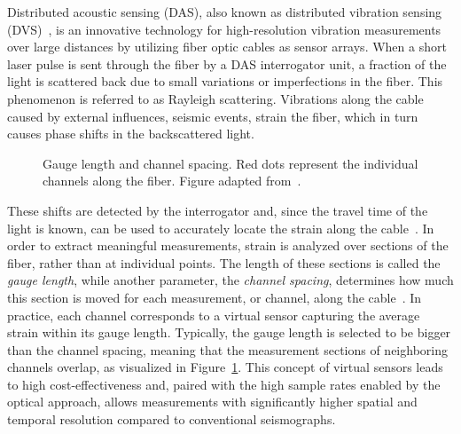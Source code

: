Distributed acoustic sensing (DAS), also known as distributed vibration sensing (DVS)~\cite{DAS}, is an innovative 
technology for high-resolution vibration measurements over large distances by utilizing fiber optic cables as sensor
arrays.
When a short laser pulse is sent through the fiber by a DAS interrogator unit, a fraction of the light is scattered back
due to small variations or imperfections in the fiber.
This phenomenon is referred to as Rayleigh scattering.
Vibrations along the cable caused by external influences, \eg seismic events, strain the fiber, which in turn causes
phase shifts in the backscattered light.
\begin{figure}
    \centering

    \caption{
        Gauge length and channel spacing. Red dots represent the individual channels along the fiber.
        Figure adapted from~\cite{GaugeLength}.
    }
    \label{fig:gauge-length}
\end{figure}
These shifts are detected by the interrogator and, since the travel time of the light is known, can be used to
accurately locate the strain along the cable~\cite{DAS-N2N}.
In order to extract meaningful measurements, strain is analyzed over sections of the fiber, rather than at individual
points.
The length of these sections is called the \textit{gauge length}, while another parameter, the \textit{channel spacing},
determines how much this section is moved for each measurement, or channel, along the cable~\cite{GaugeLength}.
In practice, each channel corresponds to a virtual sensor capturing the average strain within its gauge length.
Typically, the gauge length is selected to be bigger than the channel spacing, meaning that the measurement sections
of neighboring channels overlap, as visualized in Figure~\ref{fig:gauge-length}.
This concept of virtual sensors leads to high cost-effectiveness and, paired with the high sample rates enabled by the
optical approach, allows measurements with significantly higher spatial and temporal resolution compared to
conventional seismographs.

